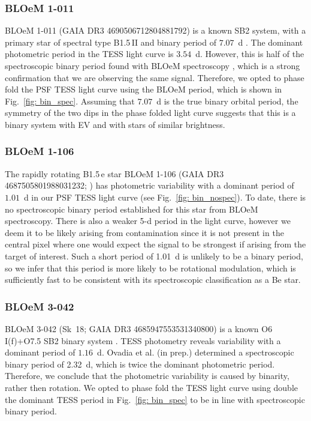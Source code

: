 \documentclass[fleqn,usenatbib]{mnras}
\begin{document}
\subsubsection{BLOeM 1-011}
BLOeM 1-011 (GAIA DR3 4690506712804881792) is a known SB2 system, with a primary star of spectral type B1.5\,II \citep{BLOeM2024,Bestenlehner+2025} and binary period of $7.07$~d \citep{Britavskiy+2025, Sana+2025NatAs}. The dominant photometric period in the TESS light curve is $3.54$~d. However, this is half of the spectroscopic binary period found with BLOeM spectroscopy \citep{Britavskiy+2025}, which is a strong confirmation that we are observing the same signal. Therefore, we opted to phase fold the PSF TESS light curve using the BLOeM period, which is shown in Fig.~\ref{fig: bin_spec}. Assuming that $7.07$~d is the true binary orbital period, the symmetry of the two dips in the phase folded light curve suggests that this is a binary system with EV and with stars of similar brightness. 

\subsubsection{BLOeM 1-106}
The rapidly rotating B1.5\,e star BLOeM 1-106 (GAIA DR3 4687505801988031232; \citealt{BLOeM2024,Bestenlehner+2025,Bodensteiner+2025}) has photometric variability with a dominant period of $1.01$~d in our PSF TESS light curve (see Fig.~\ref{fig: bin_nospec}). To date, there is no spectroscopic binary period established for this star from BLOeM spectroscopy. There is also a weaker 5-d period in the light curve, however we deem it to be likely arising from contamination since it is not present in the central pixel where one would expect the signal to be strongest if arising from the target of interest. Such a short period of 1.01~d is unlikely to be a binary period, so we infer that this period is more likely to be rotational modulation, which is sufficiently fast to be consistent with its spectroscopic classification as a Be star.

\subsubsection{BLOeM 3-042}
BLOeM 3-042 (Sk~18; GAIA DR3 4685947553531340800) is a known O6\,I(f)+O7.5 SB2 binary system \citep{BLOeM2024, Sana+2025NatAs}. TESS photometry reveals variability with a dominant period of $1.16$~d. {\color{blue}Ovadia et al.} (in prep.) determined a spectroscopic binary period of 2.32~d, which is twice the dominant photometric period. Therefore, we conclude that the photometric variability is caused by binarity, rather then rotation. We opted to phase fold the TESS light curve using double the dominant TESS period in Fig.~\ref{fig: bin_spec} to be in line with spectroscopic binary period.
\end{document}

